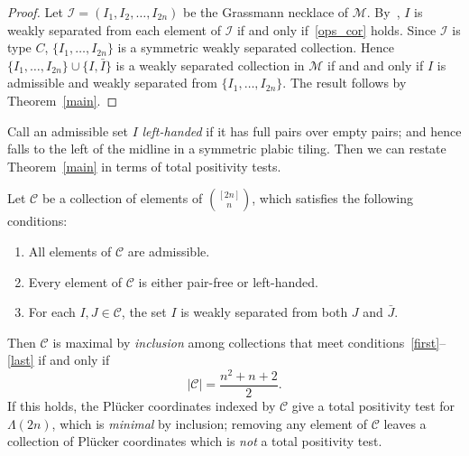 \documentclass[ALCO,ThmDefs,Unicode,epreuves]{cedram}
\newcommand{\Lm}{\Lambda}
\begin{document}
\begin{proof}
Let $\mathcal{I} = (I_1, I_2,\ldots,I_{2n})$ be the Grassmann necklace of $\mathcal{M}$. By~\cite[Corollary 11.4]{OPS15}, $I$ is weakly separated from each element of $\mathcal{I}$ if and only if~\eqref{ops_cor} holds. 
Since $\mathcal{I}$ is type $C$, $\{I_1,\ldots,I_{2n}\}$ is a symmetric weakly separated collection. 
Hence $\{I_1,\ldots,I_{2n}\} \cup \{I, \bar{I}\}$ is a weakly separated collection in $\mathcal{M}$ if and and only if $I$ is admissible and weakly separated from $\{I_1,\ldots,I_{2n}\}$.
The result follows by Theorem~\ref{main}. \end{proof}

Call an admissible set $I$ \emph{left-handed} if it has full pairs over empty pairs; and hence falls to the left of the midline in a symmetric plabic tiling. Then we can restate Theorem~\ref{main} in terms of total positivity tests. 

\begin{coro}
\label{pos_tests}
Let $\mathcal{C}$ be a collection of elements of $\binom{[2n]}{n}$, which satisfies the following conditions:
\begin{enumerate}
\item \label{first} All elements of $\mathcal{C}$ are admissible.
\item Every element of $\mathcal{C}$ is either pair-free or left-handed.
\item \label{last} For each $I, J \in \mathcal{C}$, the set $I$ is weakly separated from both $J$ and $\bar{J}$.
\end{enumerate}
Then $\mathcal{C}$ is maximal by \emph{inclusion} among collections that meet conditions~\eqref{first}--\eqref{last} if and only if 
\[|\mathcal{C}| = \frac{n^2 + n + 2}{2}.\] 
If this holds, the Pl{\"u}cker coordinates indexed by $\mathcal{C}$ give a total positivity test for $\Lm(2n)$, which is \emph{minimal} by inclusion; removing any element of $\mathcal{C}$ leaves a collection of Pl{\"u}cker coordinates which is \emph{not} a total positivity test.
\end{coro}
\end{document}
